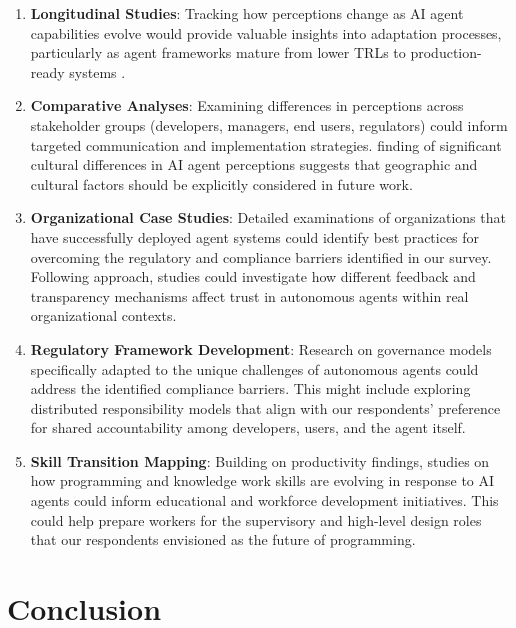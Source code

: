 \documentclass{article}
\begin{document}
\begin{enumerate}
	\def\labelenumi{\arabic{enumi}.}
	\item
	      \textbf{Longitudinal Studies}: Tracking how perceptions change as AI
	      agent capabilities evolve would provide valuable insights into
	      adaptation processes, particularly as agent frameworks mature from
	      lower TRLs to production-ready systems \cite{Wrona2023}.
	\item
	      \textbf{Comparative Analyses}: Examining differences in perceptions
	      across stakeholder groups (developers, managers, end users,
	      regulators) could inform targeted communication and implementation
	      strategies. \cite{LiuCHI2024} finding of significant cultural
	      differences in AI agent perceptions suggests that geographic and
	      cultural factors should be explicitly considered in future work.
	\item
	      \textbf{Organizational Case Studies}: Detailed examinations of
	      organizations that have successfully deployed agent systems could
	      identify best practices for overcoming the regulatory and compliance
	      barriers identified in our survey. Following \cite{Brown2025}
	      approach, studies could investigate how different feedback and
	      transparency mechanisms affect trust in autonomous agents within real
	      organizational contexts.
	\item
	      \textbf{Regulatory Framework Development}: Research on governance
	      models specifically adapted to the unique challenges of autonomous
	      agents could address the identified compliance barriers. This might
	      include exploring distributed responsibility models that align with
	      our respondents' preference for shared accountability among
	      developers, users, and the agent itself.
	\item
	      \textbf{Skill Transition Mapping}: Building on \cite{NoyZhang2023}
	      productivity findings, studies on how programming and knowledge work
	      skills are evolving in response to AI agents could inform educational
	      and workforce development initiatives. This could help prepare workers
	      for the supervisory and high-level design roles that our respondents
	      envisioned as the future of programming.
\end{enumerate}

\section{Conclusion}\label{conclusion}
\end{document}
